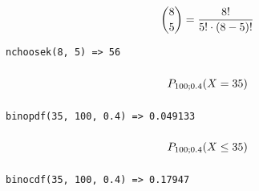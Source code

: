\documentclass
[
  fontsize = 11pt,
  parskip  = half-,
  BCOR     = 0pt,
  DIV      = 11,
  ngerman
]
{scrartcl}
\begin{document}
\begin{minipage}{\mw}
  \begin{equation*}
    \vphantom{\bigg(}%
    \binom{8}{5}=\frac{8!}{5!\cdot(8-5)!}
  \end{equation*}
\end{minipage}%
\hfill
\begin{minipage}{\cw}
\begin{verbatim}
nchoosek(8, 5) => 56
\end{verbatim}
\end{minipage}

\begin{minipage}{\mw}
  \begin{equation*}
    \vphantom{\bigg(}%
    P_{100;\num{0.4}}(X=35)
  \end{equation*}
\end{minipage}%
\hfill
\begin{minipage}{\cw}
\begin{verbatim}
binopdf(35, 100, 0.4) => 0.049133
\end{verbatim}
\end{minipage}
\begin{minipage}{\mw}
  \begin{equation*}
    \vphantom{\bigg(}%
    P_{100;\num{0.4}}(X\leq35)
  \end{equation*}
\end{minipage}%
\hfill
\begin{minipage}{\cw}
\begin{verbatim}
binocdf(35, 100, 0.4) => 0.17947
\end{verbatim}
\end{minipage}

\end{document}

